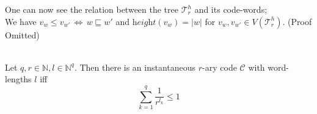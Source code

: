 \documentclass[12pt]{article}
\newcommand{\T}[0]{{\mathcal{T}_r^h}}
\newcommand{\he}[0]{\textit{height}}
\newenvironment{statement2}[2]{\begin{trivlist}
\item[\hskip \labelsep {\bfseries #1}\hskip \labelsep {\bfseries #2}]}{\end{trivlist}}
\newenvironment{statement3}[3]{\begin{trivlist}
\item[\hskip \labelsep {\bfseries #1}\hskip \labelsep {\bfseries #2} {#3}\textbf{.}]}{\end{trivlist}}
\begin{document}
\begin{statement2}{(1.6)}{Remark.} One can now see the relation between the tree $\T$ and its code-words;\\
    We have $v_w \leq v_{w'} \,\Longleftrightarrow\, w \sqsubseteq w'$
    and $\he(v_w) = |w|$ for $v_w, v_{w'} \in V(\T)$. (Proof Omitted)
\end{statement2}

\begin{statement3}{(1.7)}{Theorem}{(Kraft's Inequality)}\strut\\[2pt]
    Let $q,r \in \mathbb{N}, l \in \mathbb{N}^q$. Then there is an instantaneous $r$-ary code $\mathcal{C}$
    with word-lengths $l$ iff
    \begin{equation}
        \sum_{k=1}^{q} \frac{1}{r^{l_k}} \leq 1
    \end{equation}


\end{statement3}
\end{document}
